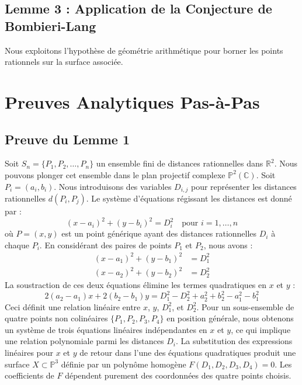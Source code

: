 \documentclass[12pt,a4paper]{article}
\begin{document}
\subsection{Lemme 3 : Application de la Conjecture de Bombieri-Lang}
Nous exploitons l'hypoth\`ese de g\'eom\'etrie arithm\'etique pour borner les points rationnels sur la surface associ\'ee.

\section{Preuves Analytiques Pas-\`a-Pas}

\subsection{Preuve du Lemme 1}

Soit $S_n = \{P_1, P_2, \dots, P_n\}$ un ensemble fini de distances rationnelles dans $\mathbb{R}^2$. Nous pouvons plonger cet ensemble dans le plan projectif complexe $\mathbb{P}^2(\mathbb{C})$. Soit $P_i = (a_i, b_i)$. Nous introduisons des variables $D_{i,j}$ pour repr\'esenter les distances rationnelles $d(P_i, P_j)$.
Le syst\`eme d'\'equations r\'egissant les distances est donn\'e par :
\begin{equation}
(x - a_i)^2 + (y - b_i)^2 = D_{i}^2 \quad \text{pour } i = 1, \dots, n
\end{equation}
o\`u $P = (x, y)$ est un point g\'en\'erique ayant des distances rationnelles $D_i$ \`a chaque $P_i$.
En consid\'erant des paires de points $P_1$ et $P_2$, nous avons :
\begin{align}
(x - a_1)^2 + (y - b_1)^2 &= D_1^2 \\
(x - a_2)^2 + (y - b_2)^2 &= D_2^2
\end{align}
La soustraction de ces deux \'equations \'elimine les termes quadratiques en $x$ et $y$ :
\begin{equation}
2(a_2 - a_1)x + 2(b_2 - b_1)y = D_1^2 - D_2^2 + a_2^2 + b_2^2 - a_1^2 - b_1^2
\end{equation}
Ceci d\'efinit une relation lin\'eaire entre $x$, $y$, $D_1^2$, et $D_2^2$. Pour un sous-ensemble de quatre points non colin\'eaires $\{P_1, P_2, P_3, P_4\}$ en position g\'en\'erale, nous obtenons un syst\`eme de trois \'equations lin\'eaires ind\'ependantes en $x$ et $y$, ce qui implique une relation polynomiale parmi les distances $D_i$.
La substitution des expressions lin\'eaires pour $x$ et $y$ de retour dans l'une des \'equations quadratiques produit une surface $X \subset \mathbb{P}^3$ d\'efinie par un polyn\^ome homog\`ene $F(D_1, D_2, D_3, D_4) = 0$. Les coefficients de $F$ d\'ependent purement des coordonn\'ees des quatre points choisis.
\end{document}
